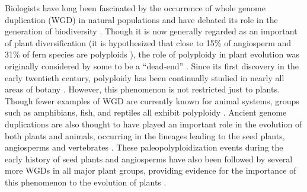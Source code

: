 \documentclass[11pt,english,letterpaper,oneside]{article}
\begin{document}
Biologists have long been fascinated by the occurrence of whole genome duplication (WGD) in natural populations and have debated its role in the generation of biodiversity \citep{GrantPlantSpeciation,StebbinsVariationEvolution,ClausKeckHies1940}. Though it is now generally regarded as an important of plant diversification (it is hypothesized that close to 15\% of angiosperm and 31\% of fern species are polyploids \citep{wood2009polyploid}), the role of polyploidy in plant evolution was originally considered by some to be a ``dead-end'' \citep{soltisd2014stebbins,wagner1970noise,StebbinsVariationEvolution}. Since its first discovery in the early twentieth century, polyploidy has been continually studied in nearly all areas of botany \citep{winge1917polyploidy,Winkler1916polyploidy,ClausKeckHies1945polyploidy,GrantPlantSpeciation,StebbinsVariationEvolution,soltisD2003polyploid,soltisd2010polyploidUnknowns,soltai2009roleOfHybridization}. However, this phenomenon is not restricted just to plants. Though fewer examples of WGD are currently known for animal systems, groups such as amphibians, fish, and reptiles all exhibit polyploidy \citep{allendorf1984tetraploidFish,gregory2005polyploidyAnimals}. Ancient genome duplications are also thought to have played an important role in the evolution of both plants and animals, occurring in the lineages leading to the seed plants, angiosperms and vertebrates \citep{ohno1970geneDuplication,furlong2001animalOctoploid,jiao2011ancientWGD,otto2000polyploidy}. These paleopolyploidization events during the early history of seed plants and angiosperms have also been followed by several more WGDs in all major plant groups, providing evidence for the importance of this phenomenon to the evolution of plants \citep{scarpino2014polyploid,canon2014polyploidyLegumes,cui2006genomeDuplication}. 
\medskip
\end{document}
